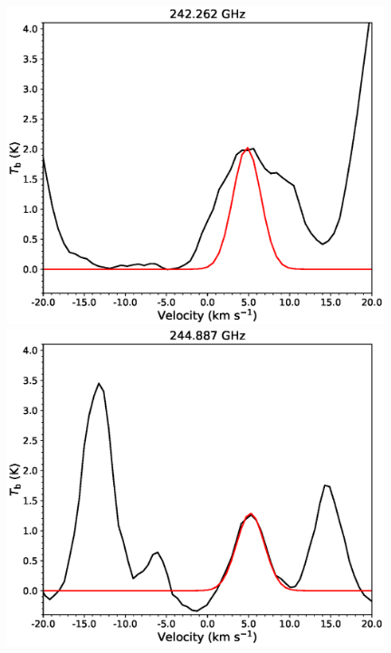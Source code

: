 \begin{figure}[H]
\begin{center}
\begin{minipage}{0.98\textwidth} 
\begin{center}
\begin{minipage}{0.48\textwidth}
\begin{center}
\includegraphics[width=0.98\textwidth]{OrionKL/spectrum/HC/242.2620195w_fit.eps}
\end{center}
\end{minipage}
\begin{minipage}{0.48\textwidth}
\begin{center}
\includegraphics[width=0.98\textwidth]{OrionKL/spectrum/HC/244.8869007w_fit.eps}
\end{center}
\end{minipage}
\end{center}
\end{minipage}


\end{center}
\end{figure}
